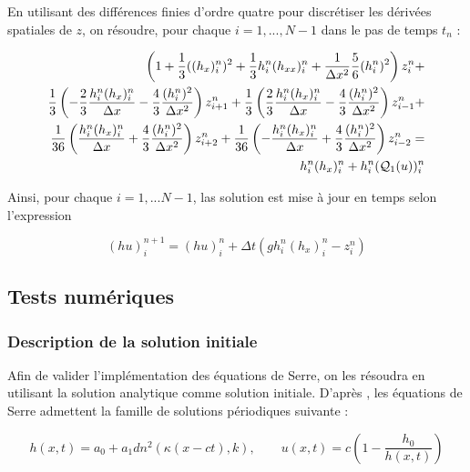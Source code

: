 \indent En utilisant des différences finies d'ordre quatre pour discrétiser les dérivées spatiales de $z$, on résoudre, pour chaque $i = 1,...,N-1$ dans le pas de temps $t_n$ :

\begin{equation*}
	\begin{split}
	 \left( 1 + \frac{1}{3}((h_x)_i^n)^2 + \frac{1}{3}h_i^n (h_{xx})_i^n + \frac{1}{\Delta x^2}\frac{5}{6}(h_i^n)^2\right)z_i^n + \\
	   \frac{1}{3}\left( -\frac{2}{3}\frac{h_i^n(h_x)_i^n}{\Delta x} - \frac{4}{3}\frac{(h_i^n)^2}{\Delta x^2} \right)z_{i+1}^n +  \frac{1}{3}\left( \frac{2}{3}\frac{h_i^n(h_x)_i^n}{\Delta x} - \frac{4}{3}\frac{(h_i^n)^2}{\Delta x^2} \right)z_{i-1}^n  + \\
	   \frac{1}{36}\left( \frac{h_i^n(h_x)_i^n}{\Delta x} + \frac{4}{3}\frac{(h_i^n)^2}{\Delta x^2} \right)z_{i+2}^n + \frac{1}{36}\left( -\frac{h_i^n(h_x)_i^n}{\Delta x} + \frac{4}{3}\frac{(h_i^n)^2}{\Delta x^2} \right)z_{i-2}^n  = \\
	    h_i^n(h_x)_{i}^n  + h_i^n(\mathcal{Q}_1(u))_i^n
	\end{split}
\end{equation*}

\indent Ainsi, pour chaque $i=1,...N-1$, las solution est mise à jour en temps selon l'expression 

\begin{equation*}
(hu)_i^{n+1} = (hu)_i^n + \Delta t \left(gh_i^n(h_x)_i^n - z_i^n \right)
\end{equation*}

\subsection{Tests numériques}

\subsubsection{Description de la solution initiale}

\indent Afin de valider l'implémentation des équations de Serre, on les résoudra en utilisant la solution analytique comme solution initiale. D'après \cite{CarterCienfuegos2011}, les équations de Serre admettent la famille de solutions périodiques suivante : 

\begin{equation*}
    h(x,t) = a_0 + a_1 dn^2(\kappa(x-ct),k), \qquad
    u(x,t) = c\left( 1 - \frac{h_0}{h(x,t)}\right)
\end{equation*}

